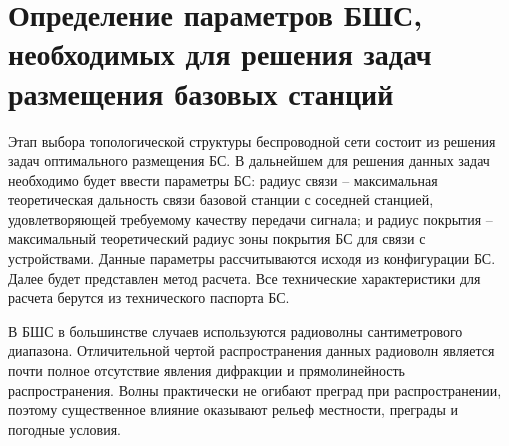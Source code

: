 \section{Определение параметров БШС, необходимых для решения задач размещения базовых станций} \label{section:part_1_link_distance}


Этап выбора топологической структуры беспроводной сети состоит из решения задач оптимального размещения БС. В дальнейшем для решения данных задач необходимо будет ввести параметры БС: радиус связи -- максимальная теоретическая дальность связи базовой станции с соседней станцией, удовлетворяющей требуемому качеству передачи сигнала; и радиус покрытия -- максимальный теоретический радиус зоны покрытия БС для связи с устройствами. Данные параметры рассчитываются исходя из конфигурации БС. Далее будет представлен метод расчета. Все технические характеристики для расчета берутся из технического паспорта БС.




В БШС в большинстве случаев используются радиоволны сантиметрового диапазона. Отличительной чертой распространения данных радиоволн  является почти полное отсутствие явления дифракции и прямолинейность распространения. Волны практически не огибают преград при распространении, поэтому существенное влияние оказывают рельеф местности, преграды и погодные условия. 

